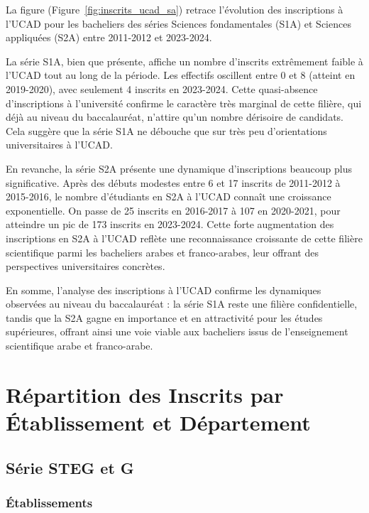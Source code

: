 La figure (Figure~\ref{fig:inscrits_ucad_sa}) retrace l'évolution des inscriptions à l'UCAD pour les bacheliers des séries Sciences fondamentales (S1A) et Sciences appliquées (S2A) entre 2011-2012 et 2023-2024.

La série S1A, bien que présente, affiche un nombre d'inscrits extrêmement faible à l'UCAD tout au long de la période. Les effectifs oscillent entre 0 et 8 (atteint en 2019-2020), avec seulement 4 inscrits en 2023-2024. 
Cette quasi-absence d'inscriptions à l'université confirme le caractère très marginal de cette filière, qui déjà au niveau du baccalauréat, n'attire qu'un nombre dérisoire de candidats. 
Cela suggère que la série S1A ne débouche que sur très peu d'orientations universitaires à l'UCAD.

En revanche, la série S2A présente une dynamique d'inscriptions beaucoup plus significative. Après des débuts modestes entre 6 et 17 inscrits de 2011-2012 à 2015-2016, le nombre d'étudiants en S2A à l'UCAD connaît une croissance exponentielle. 
On passe de 25 inscrits en 2016-2017 à 107 en 2020-2021, pour atteindre un pic de 173 inscrits en 2023-2024. Cette forte augmentation des inscriptions en S2A à l'UCAD reflète une reconnaissance croissante de cette filière scientifique parmi les bacheliers arabes et franco-arabes, leur offrant des perspectives universitaires concrètes.

En somme, l'analyse des inscriptions à l'UCAD confirme les dynamiques observées au niveau du baccalauréat : la série S1A reste une filière confidentielle, tandis que la S2A gagne en importance et en attractivité pour les études supérieures, offrant ainsi une voie viable aux bacheliers issus de l'enseignement scientifique arabe et franco-arabe.

\newpage
\section{Répartition des Inscrits par Établissement et Département}

\subsection{Série STEG et G}

\subsubsection{Établissements}

